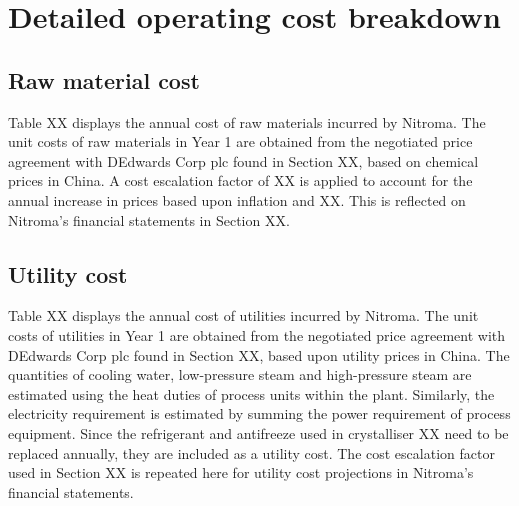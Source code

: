 \section{Detailed operating cost breakdown}
\subsection{Raw material cost}
Table XX displays the annual cost of raw materials incurred by Nitroma. The unit costs of raw materials in Year 1 are obtained from the negotiated price agreement with DEdwards Corp plc found in Section XX, based on chemical prices in China. A cost escalation factor of XX is applied to account for the annual increase in prices based upon inflation and XX. This is reflected on Nitroma’s financial statements in Section XX.

\subsection{Utility cost}
Table XX displays the annual cost of utilities incurred by Nitroma. The unit costs of utilities in Year 1 are obtained from the negotiated price agreement with DEdwards Corp plc found in Section XX, based upon utility prices in China. The quantities of cooling water, low-pressure steam and high-pressure steam are estimated using the heat duties of process units within the plant. Similarly, the electricity requirement is estimated by summing the power requirement of process equipment. Since the refrigerant and antifreeze used in crystalliser XX need to be replaced annually, they are included as a utility cost. The cost escalation factor used in Section XX is repeated here for utility cost projections in Nitroma’s financial statements.

